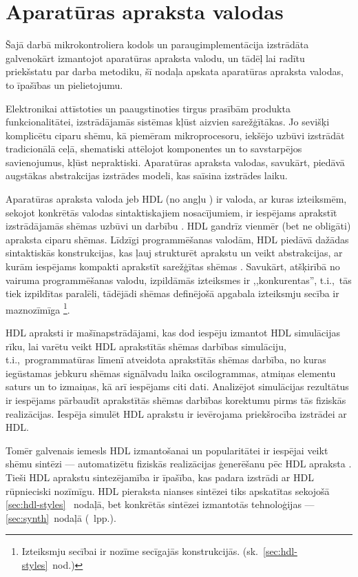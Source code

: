 \section{Aparatūras apraksta valodas}
Šajā darbā mikrokontroliera kodols un paraugimplementācija izstrādāta
galvenokārt izmantojot aparatūras apraksta valodu, un tādēļ lai radītu
priekšstatu par darba metodiku, šī nodaļa apskata 
aparatūras apraksta valodas, to īpašības un pielietojumu.

Elektronikai attīstoties un paaugstinoties tirgus prasībām produkta funkcionalitātei,
izstrādājamās sistēmas kļūst aizvien sarežģītākas. Jo sevišķi komplicētu ciparu shēmu, 
kā piemēram mikroprocesoru, iekšējo uzbūvi izstrādāt tradicionālā ceļā,
shematiski attēlojot komponentes un to savstarpējos savienojumus, kļūst
nepraktiski. Aparatūras apraksta valodas, savukārt, piedāvā augstākas
abstrakcijas izstrādes modeli, kas saīsina izstrādes laiku.

Aparatūras apraksta valoda jeb HDL
(no angļu )
ir valoda, ar kuras izteiksmēm, sekojot konkrētās 
valodas sintaktiskajiem nosa\-cī\-jumiem, ir iespējams aprakstīt
izstrādājamās shēmas uzbūvi un darbību \cite{HDL}. %
HDL gandrīz vienmēr (bet ne obligāti) apraksta ciparu shēmas.
Līdzīgi program\-mē\-šanas valodām, HDL piedāvā dažādas sintaktiskās 
konstrukcijas, kas ļauj strukturēt aprakstu un veikt abstrakcijas,
ar kurām iespējams kompakti aprakstīt sarežģītas shēmas
\cite[1.~lpp.]{Perry-VHDL}.
Savukārt, atšķirībā no vairuma programmēšanas valodu,
izpildāmās izteiksmes ir ,,konkurentas'', t.i.,~tās tiek izpildītas paralēli, 
tādējādi shēmas definējošā apgabala izteiksmju secība ir maznozīmīga%
\footnote{Izteiksmju secībai ir nozīme secīgajās konstrukcijās.
	(sk.~\ref{sec:hdl-styles}~nod.)}.

HDL apraksti ir mašīn\-apstrādājami, kas dod iespēju izmantot
HDL simulācijas rīku, lai varētu veikt HDL aprakstītās shēmas 
darbības simulāciju, t.i.,~programmatūras līmenī 
atveidota aprakstītās shēmas darbība, no kuras iegūstamas jebkuru
shēmas signālvadu laika oscilogrammas, atmiņas elementu saturs un to izmaiņas,
kā arī iespējams citi dati. Analizējot simulācijas rezultātus ir 
iespējams pārbaudīt aprakstītās shēmas darbības korektumu pirms
tās fiziskās realizācijas. Iespēja simulēt HDL aprakstu ir ievērojama
priekšrocība izstrādei ar HDL.

Tomēr galvenais iemesls HDL izmantošanai un popularitātei ir iespējai veikt 
shēmu sintēzi --- automatizētu fiziskās realizācijas ģenerēšanu pēc HDL apraksta
\cite{HDL}\cite{Perry-VHDL}\cite{Vahid-RTL}. Tieši HDL aprakstu sintezējamība ir
īpašība, kas padara izstrādi ar HDL rūpnieciski nozīmīgu.
HDL pieraksta nianses sintēzei tiks apskatītas sekojošā \ref{sec:hdl-styles}~%
nodaļā, bet konkrētās sintēzei izmantotās tehnoloģijas --- 
\ref{sec:synth}~nodaļā (\pageref{sec:synth}~lpp.).

